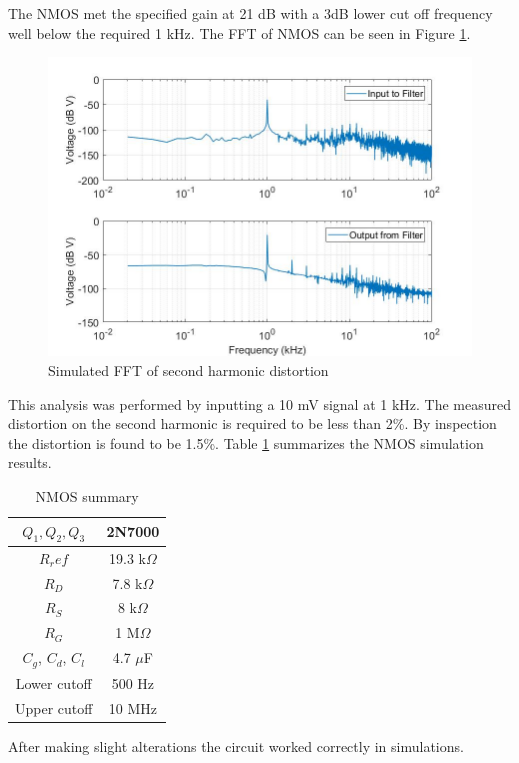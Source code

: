 	The NMOS met the specified gain at 21 dB with a 3dB lower cut off frequency well below the required 1 kHz. The FFT of NMOS can be seen in Figure \ref{fig:nmosfft}.

\begin{figure}[H]
	\centering
	\includegraphics[width=.55\textwidth]{CircuitDevelopment/nmos_FFT.jpg}
	\caption{Simulated FFT of second harmonic distortion}
	\label{fig:nmosfft}
\end{figure}

	This analysis was performed by inputting a 10 mV signal at 1 kHz. The measured distortion on the second harmonic is required to be less than 2\%. By inspection the distortion is found to be 1.5\%. Table \ref{tab:nmossum} summarizes the NMOS simulation results.
	
	
	\begin{table}[H]
		\centering
		\caption{NMOS summary}
		\label{tab:nmossum}
		\begin{tabular}{|c|c|} \hline
			$Q_1, Q_2, Q_3$ & 2N7000        \\ \hline
			$R_ref$         & 19.3 k$\Omega$ \\ \hline
			$R_D$           & 7.8 k$\Omega$  \\ \hline
			$R_S$           & 8 k$\Omega$   \\ \hline
			$R_G$           & 1 M$\Omega$  \\ \hline
			$C_g$, $C_d$, $C_l$ & 4.7 $\mu$F   \\ \hline
			Lower cutoff    &  500 Hz \\    \hline
			Upper cutoff    & 10 MHz \\    \hline
			
			     
		\end{tabular}
	\end{table}

After making slight alterations the circuit worked correctly in simulations.
	
	
	
	
	